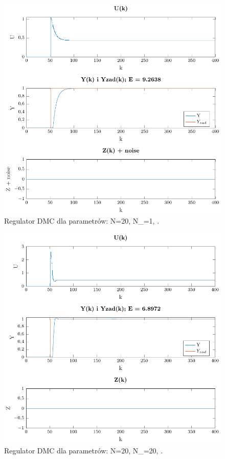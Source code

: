 \documentclass[a4paper,titlepage,11pt,twosides,floatssmall]{mwrep}
\begin{document}
\begin{figure}[H]
	\centering
	\includegraphics[scale=0.85]{../../Lab2/PDF_rysunki/Z4_DMCParametryN_20_Nu_1_lam_1.pdf}
	\caption{Regulator DMC dla parametrów: N=20, N_{}=1, .}
	\label{dobor_param3}
\end{figure}


\begin{figure}[H]
	\centering
	\includegraphics[scale=0.85]{../../Lab2/PDF_rysunki/Z4_DMCBezZaklocen.pdf}
	\caption{Regulator DMC dla parametrów: N=20, N_{}=20, .}
	\label{dobor_param4}
\end{figure}
\end{document}
